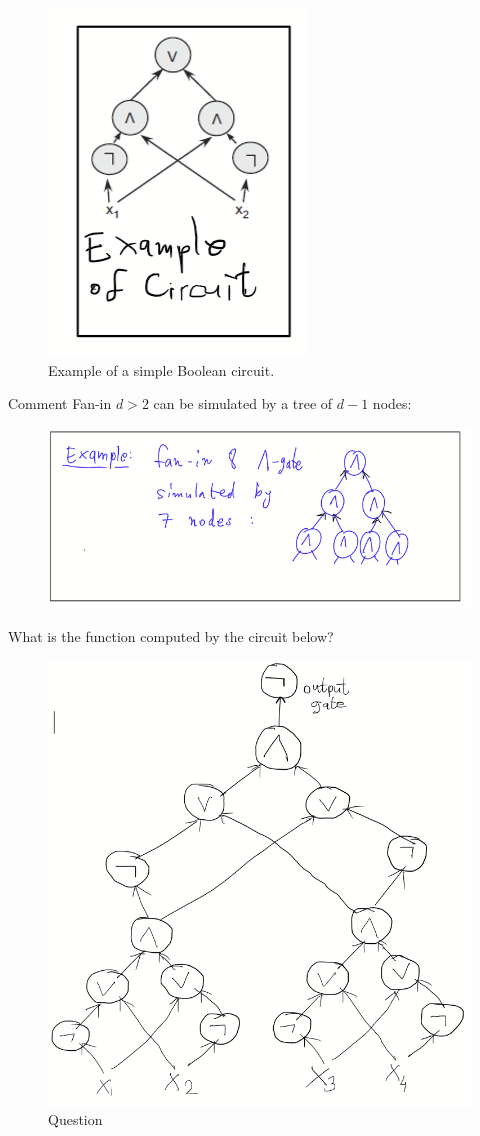 \begin{figure}
\sidecaption
  \includegraphics[width=0.2\linewidth]{images/Example-circuit.png}
    \caption{Example of a simple Boolean circuit.}
    \label{fig:enter-label}
\end{figure}

%
\begin{trailer}{Comment}
Fan-in $d>2$ 
can be simulated by a tree of $d-1 $ nodes: 
\begin{figure}[h]
    \centering
  \includegraphics[width=0.5\linewidth]{images/Example-tree-circuit.png}
    \label{fig:enter-label}
\end{figure}
\end{trailer}


\newpage 

\begin{question}{What is the function computed by the circuit below?}
\begin{figure}
    \centering
    \includegraphics[width=0.75\linewidth]{images/parity-circuit-question.png}
    \caption{Question}
    \label{fig:enter-label}
\end{figure}
\end{question}


